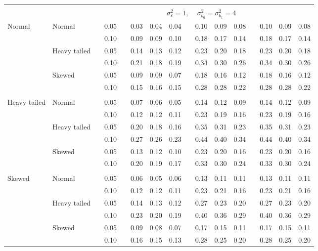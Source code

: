 \documentclass[11pt]{article} %
\begin{document}
\begin{table}[ht]
\begin{scriptsize}
\begin{center}
\begin{tabular}{ll p{.1cm} c p{.1cm} rrr p{.1cm} rrr p{.1cm} rrr}
&&&&&&&&&&&&&&&\\
& && && \multicolumn{9}{c}{$\sigma_{\varepsilon}^2 = 1$, \ \ $\sigma_{b_0}^2 = \sigma_{b_1}^2 = 4$} \\ \cline{6-16}
Normal       & Normal       && 0.05 &&  0.03 & 0.04 & 0.04 && 0.10 & 0.09 & 0.08 && 0.10 & 0.09 & 0.08 \\ 
             &              && 0.10 &&  0.09 & 0.09 & 0.10 && 0.18 & 0.17 & 0.14 && 0.18 & 0.17 & 0.14 \\ 
             & Heavy tailed && 0.05 &&  0.14 & 0.13 & 0.12 && 0.23 & 0.20 & 0.18 && 0.23 & 0.20 & 0.18 \\ 
             &              && 0.10 &&  0.21 & 0.18 & 0.19 && 0.34 & 0.30 & 0.26 && 0.34 & 0.30 & 0.26 \\ 
             & Skewed       && 0.05 &&  0.09 & 0.09 & 0.07 && 0.18 & 0.16 & 0.12 && 0.18 & 0.16 & 0.12 \\ 
             &              && 0.10 &&  0.15 & 0.16 & 0.15 && 0.28 & 0.28 & 0.22 && 0.28 & 0.28 & 0.22 \\
             &&&&&&&&&&&&&&&\\ 
Heavy tailed & Normal       && 0.05 &&  0.07 & 0.06 & 0.05 && 0.14 & 0.12 & 0.09 && 0.14 & 0.12 & 0.09 \\ 
             &              && 0.10 &&  0.12 & 0.12 & 0.11 && 0.23 & 0.19 & 0.16 && 0.23 & 0.19 & 0.16 \\ 
             & Heavy tailed && 0.05 &&  0.20 & 0.18 & 0.16 && 0.35 & 0.31 & 0.23 && 0.35 & 0.31 & 0.23 \\ 
             &              && 0.10 &&  0.27 & 0.26 & 0.23 && 0.44 & 0.40 & 0.34 && 0.44 & 0.40 & 0.34 \\ 
             & Skewed       && 0.05 &&  0.13 & 0.12 & 0.10 && 0.23 & 0.20 & 0.16 && 0.23 & 0.20 & 0.16 \\ 
             &              && 0.10 &&  0.20 & 0.19 & 0.17 && 0.33 & 0.30 & 0.24 && 0.33 & 0.30 & 0.24 \\ 
             &&&&&&&&&&&&&&&\\
Skewed       & Normal       && 0.05 &&  0.06 & 0.05 & 0.06 && 0.13 & 0.11 & 0.11 && 0.13 & 0.11 & 0.11 \\ 
             &              && 0.10 &&  0.12 & 0.12 & 0.11 && 0.23 & 0.21 & 0.16 && 0.23 & 0.21 & 0.16 \\ 
             & Heavy tailed && 0.05 &&  0.14 & 0.13 & 0.12 && 0.27 & 0.23 & 0.20 && 0.27 & 0.23 & 0.20 \\ 
             &              && 0.10 &&  0.23 & 0.20 & 0.19 && 0.40 & 0.36 & 0.29 && 0.40 & 0.36 & 0.29 \\ 
             & Skewed       && 0.05 &&  0.09 & 0.08 & 0.07 && 0.17 & 0.15 & 0.11 && 0.17 & 0.15 & 0.11 \\ 
             &              && 0.10 &&  0.16 & 0.15 & 0.13 && 0.28 & 0.25 & 0.20 && 0.28 & 0.25 & 0.20 \\ 



\end{tabular}
\end{center}
\end{scriptsize}
\end{table}
\end{document}
